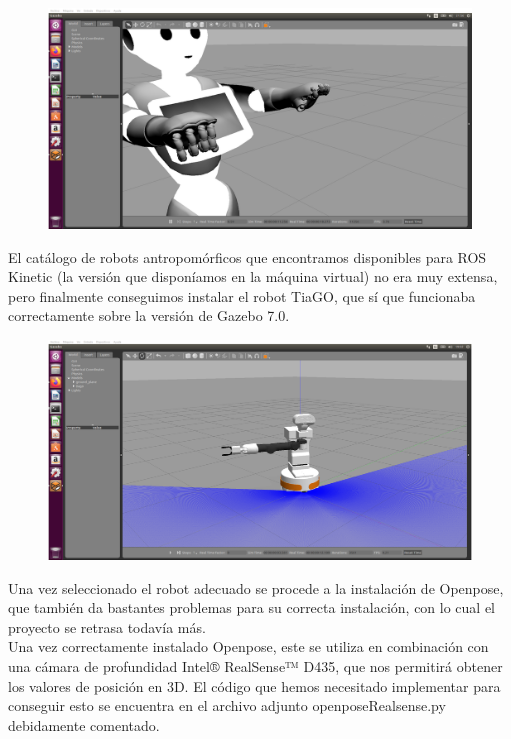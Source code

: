 \begin{figure}[hbtp]
    \centering
    \includegraphics[scale=0.3]{images/peppermano.png}
\end{figure}
 
El catálogo de robots antropomórficos que encontramos disponibles para ROS Kinetic (la versión que disponíamos en la máquina virtual) no era muy extensa, pero finalmente conseguimos instalar el robot TiaGO, que sí que funcionaba correctamente sobre la versión de Gazebo 7.0.\\
 
\begin{figure}[hbtp]
    \centering
    \includegraphics[scale=0.3]{images/tiago.png}
\end{figure}
 
Una vez seleccionado el robot adecuado se procede a la instalación de Openpose, que también da bastantes problemas para su correcta instalación, con lo cual el proyecto se retrasa todavía más.\\
 
Una vez correctamente instalado Openpose, este se utiliza en combinación con una cámara de profundidad Intel® RealSense™ D435, que nos permitirá obtener los valores de posición en 3D. El código que hemos necesitado implementar para conseguir esto se encuentra en el archivo adjunto openposeRealsense.py debidamente comentado.\\
 
